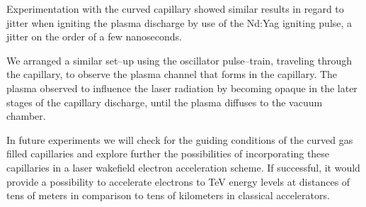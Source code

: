 \documentclass[../main.tex]{subfiles}
\begin{document}
Experimentation with the curved capillary showed similar results in regard to jitter when igniting the plasma discharge by use of the Nd:Yag igniting pulse, a jitter on the order of a few nanoseconds.

We arranged a similar set--up using the oscillator pulse--train, traveling through the capillary, to observe the plasma channel that forms in the capillary. The plasma observed to influence the laser radiation by becoming opaque in the later stages of the capillary discharge, until the plasma diffuses to the vacuum chamber.

In future experiments we will check for the guiding conditions of the curved gas filled capillaries and explore further the possibilities of incorporating these capillaries in a laser wakefield electron acceleration scheme. If successful, it would provide a possibility to accelerate electrons to \si{\tera\eV} energy levels at distances of tens of meters in comparison to tens of kilometers in classical accelerators.
\end{document}
